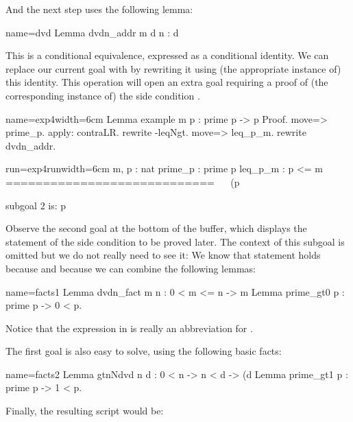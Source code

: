 And the next step uses the following lemma:

\begin{coq}{name=dvd}{}
Lemma dvdn_addr m d n : d %
\end{coq}

This is a conditional equivalence, expressed as a conditional identity.
We can replace our current goal with  by rewriting
it using (the
appropriate instance of) this identity.  This operation will open an
extra goal requiring a proof of (the corresponding instance of) the side
condition .

\begin{coq-left}{name=exp4}{width=6cm}
Lemma example m p : prime p ->
  p %
Proof.
move=> prime_p.
apply: contraLR.
rewrite -leqNgt.
move=> leq_p_m.
rewrite dvdn_addr.
\end{coq-left}
\begin{coqout-right}{run=exp4run}{width=6cm}
  m, p : nat
  prime_p : prime p
  leq_p_m : p <= m
  ============================
   ~~ (p %

subgoal 2 is:
 p %
\end{coqout-right}

Observe the second goal at the bottom of the buffer, which displays the
statement of the side condition to be proved later. The context of
this subgoal is omitted but we do not really need to see it:
We know that statement  holds because  and
because we can combine the following lemmas:

\begin{coq}{name=facts1}{}
Lemma dvdn_fact m n : 0 < m <= n -> m %
Lemma prime_gt0 p : prime p -> 0 < p.
\end{coq}
Notice that the expression  in  is really
an abbreviation for .

The first goal is also easy to solve, using the following basic facts:

\begin{coq}{name=facts2}{}
Lemma gtnNdvd n d : 0 < n -> n < d -> (d %
Lemma prime_gt1 p : prime p -> 1 < p.
\end{coq}
Finally, the resulting script would be:

